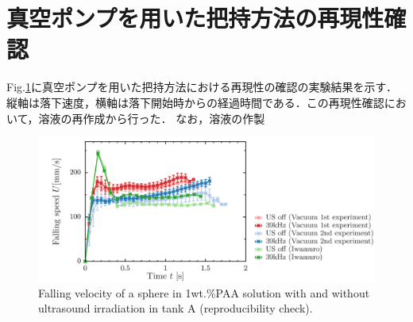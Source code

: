 \section{真空ポンプを用いた把持方法の再現性確認}
\label{sec:reexp}

Fig.\ref{fig:re-exp-vaccume}に真空ポンプを用いた把持方法における再現性の確認の実験結果を示す．縦軸は落下速度，横軸は落下開始時からの経過時間である．この再現性確認において，溶液の再作成から行った．
なお，溶液の作製

\begin{figure}[ht]
    \centering
    \includegraphics[width=14cm,clip]{X-Appendix/reexp.png}
    \caption{Falling velocity of a sphere in 1wt.\%PAA solution with and without ultrasound irradiation in tank A (reproducibility check).}
    \label{fig:re-exp-vaccume}
\end{figure}
